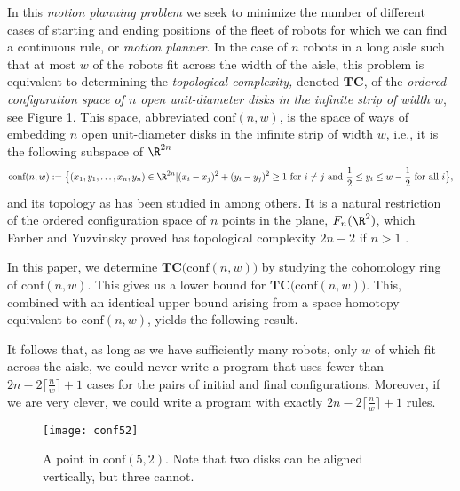 In this \emph{motion planning problem} we seek to minimize the number of different cases of starting and ending positions of the fleet of robots for which we can find a continuous rule, or \emph{motion planner}.
In the case of $n$ robots in a long aisle such that at most $w$ of the robots fit across the width of the aisle, this problem is equivalent to determining the \emph{topological complexity,} denoted $\textbf{TC}$, of the \emph{ordered configuration space of $n$ open unit-diameter disks in the infinite strip of width $w$}, see Figure \ref{conf52}.
This space, abbreviated $\text{conf}(n,w)$, is the space of ways of embedding $n$ open unit-diameter disks in the infinite strip of width $w$, i.e., it is the following subspace of $\R^{2n}$
\[
\text{conf}(n, w):=\big\{(x_{1}, y_{1}, \dots, x_{n}, y_{n})\in \R^{2n}|(x_{i}-x_{j})^{2}+(y_{i}-y_{j})^{2}\ge 1\text{ for }i\neq j\text{ and }\frac{1}{2}\le y_{i}\le w-\frac{1}{2} \text{ for all } i\big\},
\]
and its topology as has been studied in \cite{alpert2021configuration, alpert2021configuration1, BBK, wawrykow2022On, wawrykow2023representation} among others.
It is a natural restriction of the ordered configuration space of $n$ points in the plane, $F_{n}(\R^{2})$, which Farber and Yuzvinsky proved has topological complexity $2n-2$ if $n>1$ \cite[Theorem 1]{farber2002topological}.

In this paper, we determine $\textbf{TC}\big(\text{conf}(n,w)\big)$ by studying the cohomology ring of $\text{conf}(n,w)$.
This gives us a lower bound for $\textbf{TC}\big(\text{conf}(n,w)\big)$.
This, combined with an identical upper bound arising from a space homotopy equivalent to $\text{conf}(n, w)$, yields the following result.

\begin{thm}\label{top complexity of conf(n,w)}
\thmtext
\end{thm}

It follows that, as long as we have sufficiently many robots, only $w$ of which fit across the aisle, we could never write a program that uses fewer than $2n-2\big\lceil\frac{n}{w}\big\rceil+1$ cases for the pairs of initial and final configurations.
Moreover, if we are very clever, we could write a program with exactly $2n-2\big\lceil\frac{n}{w}\big\rceil+1$ rules.

\begin{figure}[h]
\centering
\captionsetup{width=.8\linewidth}
\texttt{[image: conf52]}
\caption{A point in $\text{conf}(5,2)$.
Note that two disks can be aligned vertically, but three cannot.
}
\label{conf52}
\end{figure}

